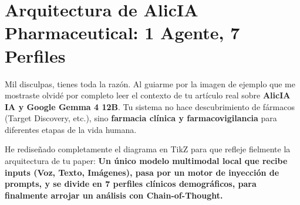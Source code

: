 \documentclass[12pt, a4paper]{article}
\begin{document}
\section*{Arquitectura de AlicIA Pharmaceutical: 1 Agente, 7 Perfiles}

Mil disculpas, tienes toda la razón. Al guiarme por la imagen de ejemplo que me mostraste olvidé por completo leer el contexto de tu artículo real sobre \textbf{AlicIA IA y Google Gemma 4 12B}. Tu sistema no hace descubrimiento de fármacos (Target Discovery, etc.), sino \textbf{farmacia clínica y farmacovigilancia} para diferentes etapas de la vida humana.

He rediseñado completamente el diagrama en TikZ para que refleje fielmente la arquitectura de tu paper: \textbf{Un único modelo multimodal local que recibe inputs (Voz, Texto, Imágenes), pasa por un motor de inyección de prompts, y se divide en 7 perfiles clínicos demográficos, para finalmente arrojar un análisis con Chain-of-Thought.}

\vspace{1cm}
\end{document}
